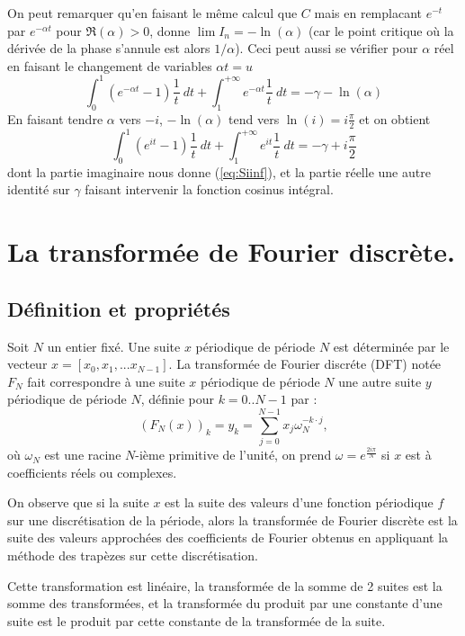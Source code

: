 \documentclass[a4paper,11pt]{article}
\begin{document}
On peut remarquer qu'en faisant le m\^eme calcul que $C$ 
mais en remplacant $e^{-t}$ par $e^{-\alpha t}$ pour $\Re(\alpha)>0$, donne
$\lim I_n=-\ln(\alpha)$ (car le point critique o\`u la d\'eriv\'ee
de la phase s'annule est alors $1/\alpha$). Ceci peut aussi se v\'erifier
pour $\alpha$ r\'eel en faisant le changement de variables $\alpha t=u$
\[ \int_0^{1}(e^{-\alpha t}-1)\frac{1}{t} \ dt + \int_1^{+\infty} e^{-\alpha t} \frac{1}{t} \ dt 
= -\gamma -\ln(\alpha) \]
En faisant tendre $\alpha$ vers $-i$, $-\ln(\alpha)$ 
tend vers $\ln(i)=i\frac{\pi}{2}$ et on obtient
\[ \int_0^{1}(e^{it}-1)\frac{1}{t} \ dt + \int_1^{+\infty} e^{i t} \frac{1}{t} \ dt 
= -\gamma + i \frac{\pi}{2} \]
dont la partie imaginaire nous donne (\ref{eq:Siinf}), et la
partie r\'eelle une autre identit\'e sur $\gamma$ faisant intervenir
la fonction cosinus int\'egral.


\section{La transform\'ee de Fourier discr\`ete.}
\label{sec:dft}
\subsection{D\'efinition et propri\'et\'es}
Soit $N$ un entier fixé. Une suite $x$ p\'eriodique de p\'eriode $N$ est
d\'etermin\'ee par le vecteur $x=[x_0,x_1,...x_{N-1}]$.
La transform\'ee de Fourier discr\'ete (DFT) notée $F_N$ fait correspondre 
à une suite $x$ p\'eriodique de p\'eriode $N$ une autre suite $y$
p\'eriodique de p\'eriode $N$, d\'efinie pour $k=0..N-1$ par :
\[ 
{(F_N(x))}_k=y_k=\sum_{j=0}^{N-1} x_j \omega_N^{-k\cdot j},
\]
où $\omega_N$ est une racine $N$-i\`eme primitive de l'unit\'e,
on prend $\omega=e^{\frac{2i\pi}{N}}$ si $x$ est à coefficients réels
ou complexes.

On observe que si la suite $x$ est la suite des valeurs d'une fonction
p\'eriodique $f$ sur une discr\'etisation de la p\'eriode, alors
la transform\'ee de Fourier discr\`ete est la suite des valeurs approch\'ees
des coefficients de Fourier obtenus en appliquant la m\'ethode des
trap\`ezes sur cette discr\'etisation.

Cette transformation est linéaire, la transformée de la somme de 2
suites est la somme des transformées, et la transformée du produit
par une constante d'une suite 
est le produit par cette constante de la transformée
de la suite.
\end{document}
